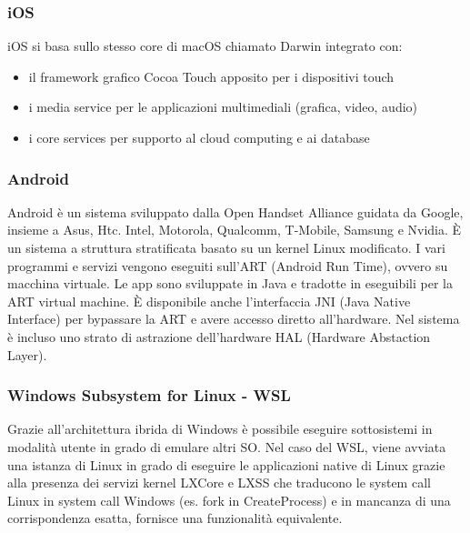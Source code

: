 \documentclass[a4paper]{article}
\begin{document}
\subsubsection*{iOS}
iOS si basa sullo stesso core di macOS chiamato Darwin integrato con:
\begin{itemize}
	\item il framework grafico Cocoa Touch apposito per i dispositivi touch
	\item i media service per le applicazioni multimediali (grafica, video, audio)
	\item i core services per supporto al cloud computing e ai database
\end{itemize}

\subsubsection*{Android}
Android è un sistema sviluppato dalla Open Handset Alliance guidata da Google, insieme a Asus, Htc. Intel, Motorola, Qualcomm,
T-Mobile, Samsung e Nvidia. È un sistema a struttura stratificata basato su un kernel Linux modificato. I vari programmi e servizi
vengono eseguiti sull'ART (Android Run Time), ovvero su macchina virtuale. Le app sono sviluppate in Java e tradotte in eseguibili
per la ART virtual machine. È disponibile anche l'interfaccia JNI (Java Native Interface) per bypassare la ART e avere accesso
diretto all'hardware. Nel sistema è incluso uno strato di astrazione dell'hardware HAL (Hardware Abstaction Layer).

\subsubsection*{Windows Subsystem for Linux - WSL}
Grazie all'architettura ibrida di Windows è possibile eseguire sottosistemi in modalità utente in grado di emulare altri SO. Nel
caso del WSL, viene avviata una istanza di Linux in grado di eseguire le applicazioni native di Linux grazie alla presenza dei
servizi kernel LXCore e LXSS che traducono le system call Linux in system call Windows (es. fork in CreateProcess) e in mancanza
di una corrispondenza esatta, fornisce una funzionalità equivalente.
\end{document}
